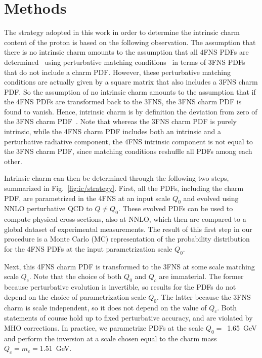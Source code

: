 \section*{Methods}
\label{sec:ic/methods}

The strategy adopted in this work in order to
determine the intrinsic charm content of the proton is 
based on the following
observation.
%
The assumption that there is no intrinsic charm
amounts to the assumption
that all 4FNS PDFs are determined~\cite{Collins:1986mp} using
perturbative matching conditions~\cite{pdfnnlo} in terms of 
3FNS PDFs
that do not include
a charm PDF.
%
However, these perturbative matching conditions are
actually given by a square matrix that also includes a 3FNS charm
PDF.
%
So the assumption of no intrinsic charm amounts to the assumption
that if the 4FNS PDFs are transformed back to the 3FNS, the 3FNS charm
PDF is found to vanish. Hence, intrinsic charm is by definition the
deviation from zero of the 3FNS charm PDF~\cite{Ball:2015dpa}. Note
that whereas the 3FNS charm PDF is purely intrinsic, while the 4FNS
charm PDF includes both an intrinsic and a perturbative
 radiative component, the
4FNS intrinsic component is not equal to the 3FNS charm PDF, since
matching conditions reshuffle all PDFs among each other. 

Intrinsic charm can then be determined through the following two steps,
summarized in Fig.~\ref{fig:ic/strategy}. 
First, all the PDFs, including the charm PDF, are parametrized 
in the 4FNS at an input scale $Q_0$ and evolved 
using NNLO perturbative QCD to   $Q \not = Q_0$.
%
These evolved PDFs can be used to 
compute physical cross-sections, also at NNLO, which then are
compared to a global dataset of experimental measurements.
%
The result of this first step in our procedure is 
a Monte Carlo (MC) representation
of the probability distribution for the 4FNS PDFs at the input
parametrization scale $Q_0$.

Next, this 4FNS charm PDF is transformed to the 3FNS at some scale matching scale
$Q_c$.
%
Note that the choice of both $Q_0$ and $Q_c$ are immaterial. The former
because perturbative evolution is invertible, so
results for the PDFs do not depend on the choice of
parametrization scale $Q_0$. The latter because 
the 3FNS charm is scale independent, so it does not depend on the
value of $Q_c$.
Both statements of course hold up to fixed perturbative accuracy, and
are violated by MHO corrections.
%
In practice, we parametrize PDFs at the scale
$Q_0=$~1.65~GeV and perform the inversion at a scale
chosen equal to the charm mass $Q_c=m_c=1.51$~GeV.

